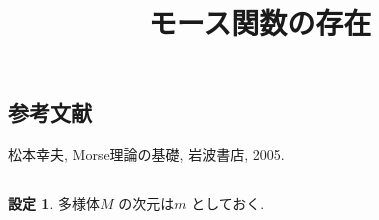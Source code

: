\documentclass[10pt, fleqn, label-section=none]{bxjsarticle}
\title{モース関数の存在}
\date{}
\author{}
\theoremstyle{definition}
\newtheorem{setting}[dfn]{設定}
\renewcommand{\;}{\, ; \,}
\begin{document}
\maketitle



\section{}

\subsection{参考文献}

松本幸夫, Morse理論の基礎, 岩波書店, 2005.

\subsection{}

\begin{setting}
多様体$M$ の次元は$m$ としておく. 
\end{setting}
\end{document}
